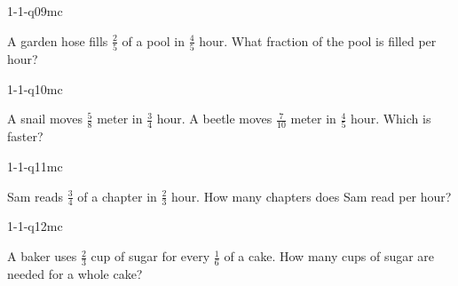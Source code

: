 \begin{practiceQuestion}{1-1-q09}{mc}
\begin{questionText}
A garden hose fills $\frac{2}{5}$ of a pool in $\frac{4}{5}$ hour. What fraction of the pool is filled per hour?
\end{questionText}
\end{practiceQuestion}

\begin{practiceQuestion}{1-1-q10}{mc}
\begin{questionText}
A snail moves $\frac{5}{8}$ meter in $\frac{3}{4}$ hour. A beetle moves $\frac{7}{10}$ meter in $\frac{4}{5}$ hour. Which is faster?
\end{questionText}
\end{practiceQuestion}

\begin{practiceQuestion}{1-1-q11}{mc}
\begin{questionText}
Sam reads $\frac{3}{4}$ of a chapter in $\frac{2}{3}$ hour. How many chapters does Sam read per hour?
\end{questionText}
\end{practiceQuestion}

\begin{practiceQuestion}{1-1-q12}{mc}
\begin{questionText}
A baker uses $\frac{2}{3}$ cup of sugar for every $\frac{1}{6}$ of a cake. How many cups of sugar are needed for a whole cake?
\end{questionText}
\end{practiceQuestion}

